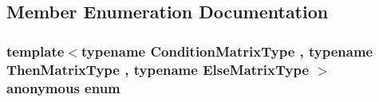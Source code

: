 \subsection{Member Enumeration Documentation}
\hypertarget{structei__traits_3_01_select_3_01_condition_matrix_type_00_01_then_matrix_type_00_01_else_matrix_type_01_4_01_4_ad47d71b728e8f53706df432a3b25ff74}{\subsubsection[{anonymous enum}]{\setlength{\rightskip}{0pt plus 5cm}template$<$typename Condition\-Matrix\-Type , typename Then\-Matrix\-Type , typename Else\-Matrix\-Type $>$ anonymous enum}}\label{structei__traits_3_01_select_3_01_condition_matrix_type_00_01_then_matrix_type_00_01_else_matrix_type_01_4_01_4_ad47d71b728e8f53706df432a3b25ff74}
